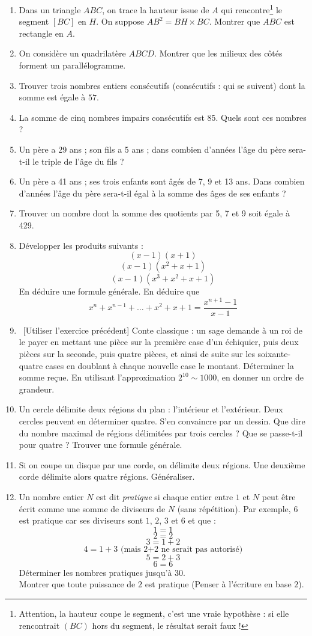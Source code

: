 \documentclass[14pt]{extreport}
\newcounter{n}
\theoremstyle{plain}
\begin{document}
\begin{enumerate}
\item Dans un triangle $ABC$, on trace la hauteur issue de $A$ qui rencontre\footnote{Attention, la hauteur coupe le segment, c'est une vraie hypothèse : si elle rencontrait $(BC)$ hors du segment, le résultat serait faux !} le segment $[BC]$ en $H$. On suppose $AB^2 = BH \times BC$. Montrer que $ABC$ est rectangle en $A$. 
\item On considère un quadrilatère $ABCD$. Montrer que les milieux des côtés forment un  parallélogramme.
 \item Trouver trois nombres entiers consécutifs (consécutifs : qui se suivent) dont la somme est égale à $57$. 
 \item La somme de cinq nombres impairs consécutifs est 85. Quels sont ces nombres ? 
 \item Un père a 29 ans ; son fils a 5 ans ; dans combien d'années l'âge du père sera-t-il le triple de l'âge du fils ? 
 \item Un père a 41 ans ; ses trois enfants sont âgés de 7, 9 et 13 ans. Dans combien d'années l'âge du père sera-t-il égal à la somme des âges de ses enfants ? 
 \item Trouver un nombre dont la somme des quotients par 5, 7 et 9 soit égale à 429. 
 \item Développer les produits suivants : 
 \[ (x-1)(x+1)\]
 \[(x-1)(x^2+x+1)\]
 \[(x-1)(x^3+x^2+x+1)\]
 En déduire une formule générale. En déduire que 
 \[ x^n+ x^{n-1}+\ldots + x^2 + x + 1 = \frac{x^{n+1}-1}{x-1}\]
 \item \  [Utiliser l'exercice précédent] Conte classique : un sage demande à un roi de le payer en mettant une pièce sur la première case d'un échiquier, puis deux pièces sur la seconde, puis quatre pièces, et ainsi de suite sur les soixante-quatre cases en doublant à chaque nouvelle case le montant. Déterminer la somme reçue. En utilisant l'approximation $2^{10} \sim 1000$, en donner un ordre de grandeur. 
 \item Un cercle délimite deux régions du plan : l'intérieur et l'extérieur. Deux cercles peuvent en déterminer quatre. S'en convaincre par un dessin. Que dire du nombre maximal de régions délimitées par trois cercles ? Que se passe-t-il pour quatre ? Trouver une formule générale.
 \item Si on coupe un disque par une corde, on délimite deux régions. Une deuxième corde délimite alors quatre régions. Généraliser. 
 \item Un nombre entier $N$ est dit \emph{pratique} si chaque entier entre $1$ et $N$ peut être écrit comme une somme de diviseurs de $N$ (sans répétition). Par exemple, $6$ est pratique car ses diviseurs sont $1$, $2$, $3$ et $6$ et que : 
 \[ 1 = 1\] 
 \[ 2 = 2 \]
 \[ 3 = 1 + 2 \]
 \[ 4 = 1+3 \text{ (mais 2+2 ne serait pas autorisé)}\]
 \[ 5 = 2 + 3 \]
 \[ 6 = 6\]
 Déterminer les nombres pratiques jusqu'à $30$. \\
 Montrer que toute puissance de $2$ est pratique (Penser à l'écriture en base $2$). 
\end{enumerate} 
 
\end{document}
